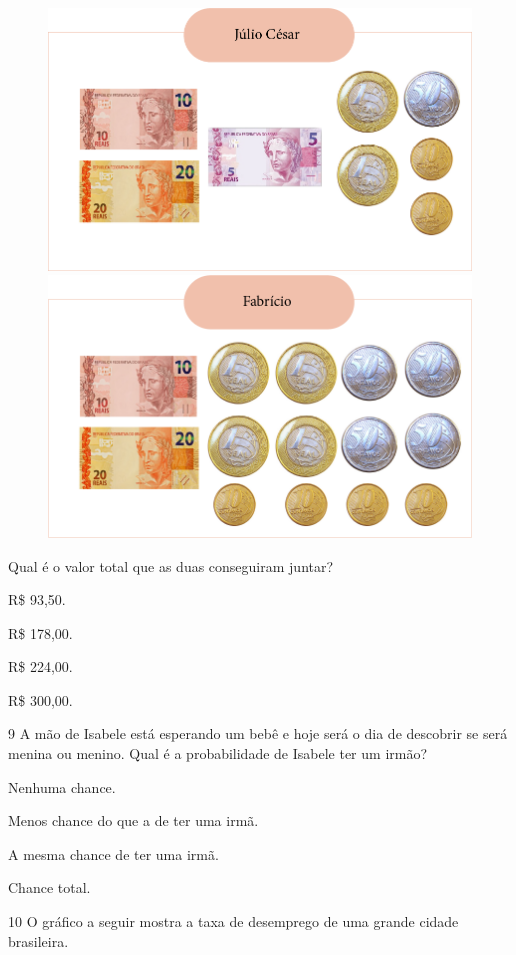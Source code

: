 \pagebreak
\begin{figure}[htpb!]
\includegraphics[width=.5\textwidth]{media/image78a.png}
\includegraphics[width=.5\textwidth]{media/image78b.png}
\end{figure}

Qual é o valor total que as duas conseguiram juntar?

\begin{escolha}
\item
  R\$ 93,50.
\item
  R\$ 178,00.
\item
  R\$ 224,00.
\item
  R\$ 300,00.
\end{escolha}


\num{9} A mão de Isabele está esperando um bebê e hoje será o dia de descobrir
se será menina ou menino. Qual é a probabilidade de Isabele ter um irmão?

\begin{escolha}
\item
  Nenhuma chance.
\item
  Menos chance do que a de ter uma irmã.
\item
  A mesma chance de ter uma irmã.
\item
  Chance total.
\end{escolha}

\pagebreak
\num{10} O gráfico a seguir mostra a taxa de desemprego de uma grande cidade
brasileira.


